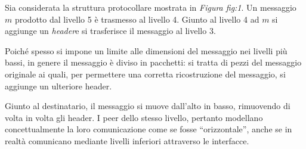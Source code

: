 \documentclass{subfiles}
\begin{document}
Sia considerata la struttura protocollare mostrata in \emph{Figura \emph{fig:1}}.
Un messaggio $m$ prodotto dal livello 5 è trasmesso al livello 4.
Giunto al livello 4 ad $m$ si aggiunge un \emph{header}\footnotemark[1] e si trasferisce il messaggio al livello 3.

Poiché spesso si impone un limite alle dimensioni del messaggio nei livelli più bassi, in genere il messaggio è diviso in pacchetti:
si tratta di pezzi del messaggio originale ai quali, per permettere una corretta ricostruzione del messaggio, si aggiunge un ulteriore header.

Giunto al destinatario, il messaggio si muove dall'alto in basso, rimuovendo di volta in volta gli header.
I peer dello stesso livello, pertanto modellano concettualmente la loro comunicazione come se fosse “orizzontale”,
anche se in realtà comunicano mediante livelli inferiori attraverso le interfacce.


\end{document}
